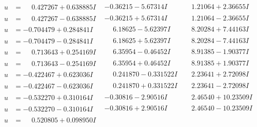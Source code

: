 \documentclass[1p]{elsarticle_modified}
\theoremstyle{definition}
\begin{document}
$$\begin{array}{c|c|c}
\begin{aligned}
u &= \phantom{-}0.427267 + 0.638885 I\end{aligned}
 & -0.36215 - 5.67314 I & \phantom{-}1.21064 + 2.36655 I \\ \hline\begin{aligned}
u &= \phantom{-}0.427267 - 0.638885 I\end{aligned}
 & -0.36215 + 5.67314 I & \phantom{-}1.21064 - 2.36655 I \\ \hline\begin{aligned}
u &= -0.704479 + 0.284841 I\end{aligned}
 & \phantom{-}6.18625 - 5.62397 I & \phantom{-}8.20284 + 7.44163 I \\ \hline\begin{aligned}
u &= -0.704479 - 0.284841 I\end{aligned}
 & \phantom{-}6.18625 + 5.62397 I & \phantom{-}8.20284 - 7.44163 I \\ \hline\begin{aligned}
u &= \phantom{-}0.713643 + 0.254169 I\end{aligned}
 & \phantom{-}6.35954 - 0.46452 I & \phantom{-}8.91385 - 1.90377 I \\ \hline\begin{aligned}
u &= \phantom{-}0.713643 - 0.254169 I\end{aligned}
 & \phantom{-}6.35954 + 0.46452 I & \phantom{-}8.91385 + 1.90377 I \\ \hline\begin{aligned}
u &= -0.422467 + 0.623036 I\end{aligned}
 & \phantom{-}0.241870 - 0.331522 I & \phantom{-}2.23641 + 2.72098 I \\ \hline\begin{aligned}
u &= -0.422467 - 0.623036 I\end{aligned}
 & \phantom{-}0.241870 + 0.331522 I & \phantom{-}2.23641 - 2.72098 I \\ \hline\begin{aligned}
u &= -0.532270 + 0.310164 I\end{aligned}
 & -0.30816 - 2.90516 I & \phantom{-}2.46540 + 10.23509 I \\ \hline\begin{aligned}
u &= -0.532270 - 0.310164 I\end{aligned}
 & -0.30816 + 2.90516 I & \phantom{-}2.46540 - 10.23509 I \\ \hline\begin{aligned}
u &= \phantom{-}0.520805 + 0.098950 I\end{aligned}

\end{array}$$
\end{document}
